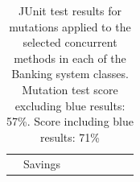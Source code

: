 \documentclass[a4paper,12pt]{article}
\begin{document}
\begin{table}[htp]
\begin{tabular}{lcllllll}
\multicolumn{1}{c|}{\textbf{}}                                                                                   & \multicolumn{1}{c|}{Savings}   & \multicolumn{1}{l|}{\cellcolor[HTML]{32CB00}} & \multicolumn{1}{l|}{\cellcolor[HTML]{FE0000}} & \multicolumn{1}{l|}{\cellcolor[HTML]{FFFFFF}} & \multicolumn{1}{l|}{\cellcolor[HTML]{32CB00}} & \multicolumn{1}{l|}{\cellcolor[HTML]{31A4FF}} & \multicolumn{1}{l|}{\cellcolor[HTML]{FFFFFF}} \\ \cline{2-8} 
\end{tabular}
\caption{JUnit test results for mutations applied to the selected concurrent methods in each of the Banking system classes. Mutation test score excluding blue results: 57\%. Score including blue results: 71\%}
\label{table:banking_junit_results}
\end{table}

\vspace{3cm}
\end{document}

